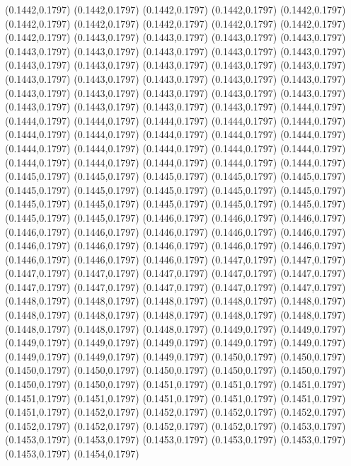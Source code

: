 (0.1442,0.1797)
(0.1442,0.1797)
(0.1442,0.1797)
(0.1442,0.1797)
(0.1442,0.1797)
\PST@Solid(0.1442,0.1797)
(0.1442,0.1797)
(0.1442,0.1797)
(0.1442,0.1797)
(0.1442,0.1797)
(0.1442,0.1797)
(0.1443,0.1797)
(0.1443,0.1797)
(0.1443,0.1797)
(0.1443,0.1797)
(0.1443,0.1797)
(0.1443,0.1797)
(0.1443,0.1797)
(0.1443,0.1797)
(0.1443,0.1797)
(0.1443,0.1797)
(0.1443,0.1797)
(0.1443,0.1797)
(0.1443,0.1797)
(0.1443,0.1797)
(0.1443,0.1797)
(0.1443,0.1797)
(0.1443,0.1797)
(0.1443,0.1797)
(0.1443,0.1797)
(0.1443,0.1797)
(0.1443,0.1797)
(0.1443,0.1797)
(0.1443,0.1797)
(0.1443,0.1797)
(0.1443,0.1797)
(0.1443,0.1797)
(0.1443,0.1797)
(0.1443,0.1797)
(0.1444,0.1797)
(0.1444,0.1797)
(0.1444,0.1797)
(0.1444,0.1797)
(0.1444,0.1797)
(0.1444,0.1797)
(0.1444,0.1797)
(0.1444,0.1797)
(0.1444,0.1797)
(0.1444,0.1797)
(0.1444,0.1797)
(0.1444,0.1797)
(0.1444,0.1797)
(0.1444,0.1797)
(0.1444,0.1797)
(0.1444,0.1797)
(0.1444,0.1797)
(0.1444,0.1797)
(0.1444,0.1797)
(0.1444,0.1797)
(0.1444,0.1797)
(0.1445,0.1797)
(0.1445,0.1797)
(0.1445,0.1797)
(0.1445,0.1797)
(0.1445,0.1797)
(0.1445,0.1797)
(0.1445,0.1797)
(0.1445,0.1797)
(0.1445,0.1797)
(0.1445,0.1797)
(0.1445,0.1797)
(0.1445,0.1797)
(0.1445,0.1797)
(0.1445,0.1797)
(0.1445,0.1797)
(0.1445,0.1797)
(0.1445,0.1797)
(0.1446,0.1797)
(0.1446,0.1797)
(0.1446,0.1797)
(0.1446,0.1797)
(0.1446,0.1797)
(0.1446,0.1797)
(0.1446,0.1797)
(0.1446,0.1797)
(0.1446,0.1797)
(0.1446,0.1797)
(0.1446,0.1797)
(0.1446,0.1797)
(0.1446,0.1797)
(0.1446,0.1797)
(0.1446,0.1797)
(0.1446,0.1797)
(0.1447,0.1797)
(0.1447,0.1797)
(0.1447,0.1797)
(0.1447,0.1797)
(0.1447,0.1797)
(0.1447,0.1797)
(0.1447,0.1797)
(0.1447,0.1797)
(0.1447,0.1797)
(0.1447,0.1797)
(0.1447,0.1797)
(0.1447,0.1797)
(0.1448,0.1797)
\PST@Solid(0.1448,0.1797)
(0.1448,0.1797)
(0.1448,0.1797)
(0.1448,0.1797)
(0.1448,0.1797)
(0.1448,0.1797)
(0.1448,0.1797)
(0.1448,0.1797)
(0.1448,0.1797)
(0.1448,0.1797)
(0.1448,0.1797)
(0.1448,0.1797)
(0.1449,0.1797)
(0.1449,0.1797)
(0.1449,0.1797)
(0.1449,0.1797)
(0.1449,0.1797)
(0.1449,0.1797)
(0.1449,0.1797)
(0.1449,0.1797)
(0.1449,0.1797)
(0.1449,0.1797)
(0.1450,0.1797)
(0.1450,0.1797)
(0.1450,0.1797)
(0.1450,0.1797)
(0.1450,0.1797)
(0.1450,0.1797)
(0.1450,0.1797)
(0.1450,0.1797)
(0.1450,0.1797)
(0.1451,0.1797)
(0.1451,0.1797)
(0.1451,0.1797)
(0.1451,0.1797)
(0.1451,0.1797)
(0.1451,0.1797)
(0.1451,0.1797)
(0.1451,0.1797)
(0.1451,0.1797)
(0.1452,0.1797)
(0.1452,0.1797)
(0.1452,0.1797)
(0.1452,0.1797)
(0.1452,0.1797)
(0.1452,0.1797)
(0.1452,0.1797)
(0.1452,0.1797)
(0.1453,0.1797)
(0.1453,0.1797)
(0.1453,0.1797)
(0.1453,0.1797)
(0.1453,0.1797)
(0.1453,0.1797)
(0.1453,0.1797)
(0.1454,0.1797)
